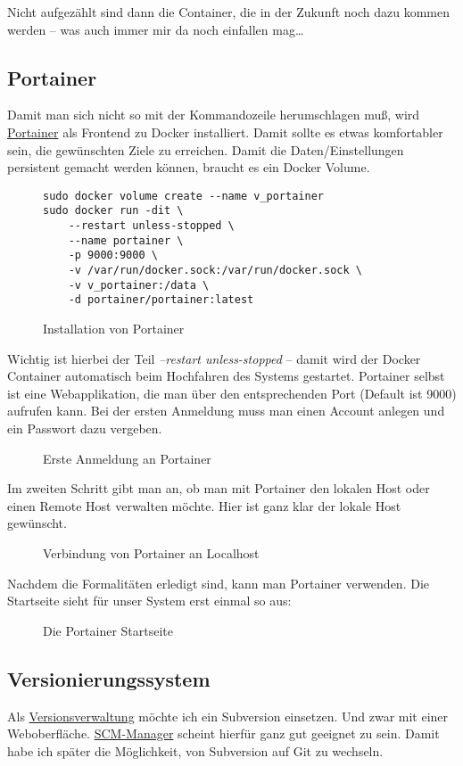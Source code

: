 \documentclass[12pt,a4paper]{article}
\newcommand{\code}[1]{\textit{#1}}
\newcommand{\jpaimg}[2]{\begin{figure}[H]\centering\fbox{\texttt{[image: \#1]}}\caption{#2}\label{fig:#2}\end{figure}}
\newcommand{\jpaquote}[1]{\glqq{}#1\grqq{}}
\begin{document}
Nicht aufgezählt sind dann die Container, die in der Zukunft noch dazu kommen werden -- was auch immer mir da noch
einfallen mag\ldots

\subsection{Portainer}\label{sub:Portainer}
Damit man sich nicht so mit der Kommandozeile herumschlagen muß, wird \href{https://hub.docker.com/r/portainer/portainer/}{Portainer}
als Frontend zu Docker installiert. Damit sollte es etwas komfortabler sein, die gewünschten Ziele zu erreichen. Damit
die Daten/Einstellungen persistent gemacht werden können, braucht es ein Docker Volume.

\begin{figure}[H]
\begin{lstlisting}
sudo docker volume create --name v_portainer
sudo docker run -dit \
    --restart unless-stopped \
    --name portainer \
    -p 9000:9000 \
    -v /var/run/docker.sock:/var/run/docker.sock \
    -v v_portainer:/data \
    -d portainer/portainer:latest
\end{lstlisting}
\caption{Installation von Portainer}\label{fig:Installation von Portainer}
\end{figure}

Wichtig ist hierbei der Teil \code{--restart unless-stopped} -- damit wird der Docker Container automatisch beim
Hochfahren des Systems gestartet. Portainer selbst ist eine Webapplikation, die man über den entsprechenden Port
(Default ist 9000) aufrufen kann. Bei der ersten Anmeldung muss man einen Account anlegen und ein Passwort dazu vergeben.

\jpaimg{./images/Portainer-01.png}{Erste Anmeldung an Portainer}

Im zweiten Schritt gibt man an, ob man mit Portainer den lokalen Host oder einen Remote Host verwalten möchte. Hier ist
ganz klar der lokale Host gewünscht.

\jpaimg{./images/Portainer-02.png}{Verbindung von Portainer an Localhost}

Nachdem die \jpaquote{Formalitäten} erledigt sind, kann man Portainer verwenden. Die Startseite sieht für unser System
erst einmal so aus:

\jpaimg{./images/Portainer-03.png}{Die Portainer Startseite}

\subsection{Versionierungssystem}\label{sub:SCM-Manager}
Als \href{https://de.wikipedia.org/wiki/Versionsverwaltung}{Versionsverwaltung} möchte ich ein Subversion einsetzen.
Und zwar mit einer Web\-oberfläche. \href{https://www.scm-manager.org/}{SCM-Manager} scheint hierfür ganz gut geeignet
zu sein. Damit habe ich später die Möglichkeit, von Subversion auf Git zu wechseln.
\end{document}
